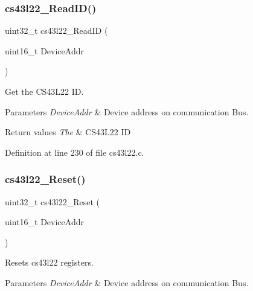 \subsubsection{\texorpdfstring{cs43l22\+\_\+\+Read\+I\+D()}{cs43l22\_ReadID()}}
{\footnotesize\ttfamily uint32\+\_\+t cs43l22\+\_\+\+Read\+ID (\begin{DoxyParamCaption}\item[{uint16\+\_\+t}]{Device\+Addr }\end{DoxyParamCaption})}



Get the C\+S43\+L22 ID. 


\begin{DoxyParams}{Parameters}
{\em Device\+Addr} & Device address on communication Bus. ~\newline
\\
\hline
\end{DoxyParams}

\begin{DoxyRetVals}{Return values}
{\em The} & C\+S43\+L22 ID \\
\hline
\end{DoxyRetVals}


Definition at line 230 of file cs43l22.\+c.

\mbox{\label{group___c_s43_l22___exported___functions_ga647488feb466972a5557a2fe2e9350e7}} 
\subsubsection{\texorpdfstring{cs43l22\+\_\+\+Reset()}{cs43l22\_Reset()}}
{\footnotesize\ttfamily uint32\+\_\+t cs43l22\+\_\+\+Reset (\begin{DoxyParamCaption}\item[{uint16\+\_\+t}]{Device\+Addr }\end{DoxyParamCaption})}



Resets cs43l22 registers. 


\begin{DoxyParams}{Parameters}
{\em Device\+Addr} & Device address on communication Bus. \\
\hline
\end{DoxyParams}


